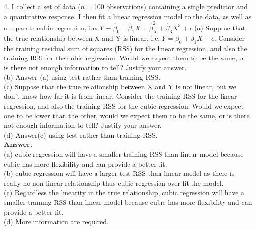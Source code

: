 \documentclass[12pt]{article}
\begin{document}
4. I collect a set of data ($n=$100 observations) containing a single predictor and a quantitative response. I then fit a linear regression model to the data, as well as a separate cubic regression, i.e. $Y=\hat{\beta}_0+\hat{\beta}_1X+\hat{\beta}_X^2+\hat{\beta}_3X^3+\epsilon$
(a) Suppose that the true relationship between X and Y is linear, i.e. $Y=\beta_0+\beta_1X+\epsilon$. Consider the training residual sum of squares (RSS) for the linear regression, and also the training RSS for the cubic regression. Would we expect them to be the same, or is there not enough information to tell? Justify your answer. \\
(b) Answer (a) using test rather than training RSS.\\
(c) Suppose that the true relationship between X and Y is not linear, but we don't know how far it is from linear. Consider the training RSS for the linear regression, and also the training RSS for the cubic regression. Would we expect one to be lower than the other, would we expect them to be the same, or is there not enough information to tell? Justify your answer. \\
(d) Answer(c) using test rather than training RSS.\\
\textbf{Answer:}\\
(a) cubic regression will have a smaller training RSS than linear model because cubic has more flexibility and can provide a better fit.\\
(b) cubic regression will have a larger test RSS than linear model as there is really no non-linear relationship thus cubic regression over fit the model. \\
(c) Regardless the linearity in the true relationship, cubic regression will have a smaller training RSS than linear model because cubic has more flexibility and can provide a better fit.\\
(d) More information are required.\\
 
\end{document}
